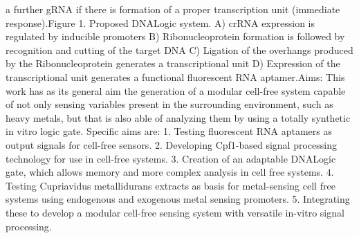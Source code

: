 a further gRNA if there is formation of a proper transcription unit (immediate
response).Figure 1. Proposed DNALogic system. A) crRNA expression is regulated
by inducible promoters B) Ribonucleoprotein formation is followed by recognition
and cutting of the target DNA C) Ligation of the overhangs produced by the
Ribonucleoprotein generates a transcriptional unit D) Expression of the
transcriptional unit generates a functional fluorescent RNA aptamer.Aims: This
work has as its general aim the generation of a modular cell-free system capable
of not only sensing variables present in the surrounding environment, such as
heavy metals, but that is also able of analyzing them by using a totally
synthetic in vitro logic gate. Specific aims are: 1. Testing fluorescent RNA
aptamers as output signals for cell-free sensors. 2. Developing Cpf1-based
signal processing technology for use in cell-free systems. 3. Creation of an
adaptable DNALogic gate, which allows memory and more complex analysis in cell
free systems. 4. Testing Cupriavidus metallidurans extracts as basis for
metal-sensing cell free systems using endogenous and exogenous metal sensing
promoters. 5. Integrating these to develop a modular cell-free sensing system
with versatile in-vitro signal processing.
